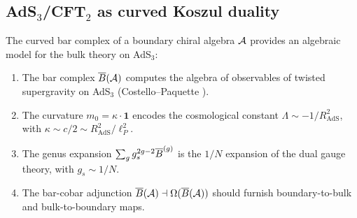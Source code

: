 \subsection{\texorpdfstring{AdS$_3$/CFT$_2$ as curved Koszul duality}{AdS3/CFT2 as curved Koszul duality}}
\label{subsec:ads-cft-koszul}

\begin{conjecture}\label{conj:ads-cft-bar}
The curved bar complex of a boundary chiral algebra $\mathcal{A}$ provides
an algebraic model for the bulk theory on AdS$_3$:
\begin{enumerate}[label=\textup{(\roman*)}]
\item The bar complex $\overline{B}(\mathcal{A})$ computes the algebra of
  observables of twisted supergravity on AdS$_3$
  \textup{(}Costello--Paquette \cite{CP2020}\textup{)}.
\item The curvature $m_0 = \kappa \cdot \mathbf{1}$ encodes
  the cosmological constant $\Lambda \sim -1/R_{\mathrm{AdS}}^2$,
  with $\kappa \sim c/2 \sim R_{\mathrm{AdS}}^2/\ell_P^2$.
\item The genus expansion $\sum_g g_s^{2g-2} \overline{B}^{(g)}$
  is the $1/N$ expansion of the dual gauge theory, with
  $g_s \sim 1/N$.
\item The bar-cobar adjunction
  $\overline{B}(\mathcal{A}) \dashv \Omega(\overline{B}(\mathcal{A}))$
  should furnish boundary-to-bulk and bulk-to-boundary maps.
\end{enumerate}
\end{conjecture}

